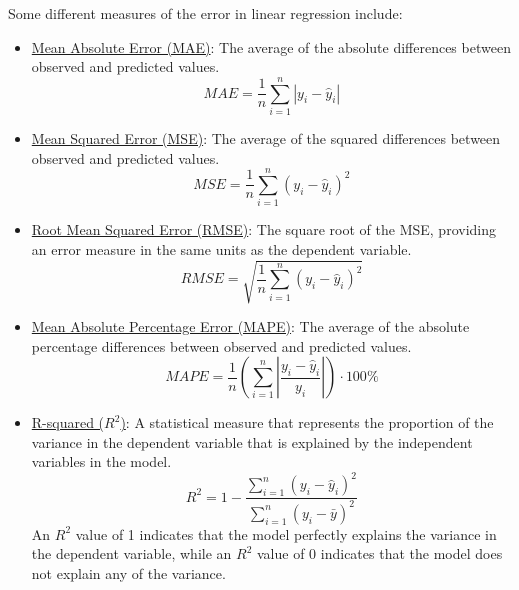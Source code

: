 Some different measures of the error in linear regression include:
\begin{itemize}
    \item \ul{Mean Absolute Error (MAE)}: The average of the absolute differences between observed and predicted values.
    \begin{equation*}
        MAE = \frac{1}{n} \sum_{i=1}^{n} |y_i - \hat{y}_i|
    \end{equation*}
    \item \ul{Mean Squared Error (MSE)}: The average of the squared differences between observed and predicted values.
    \begin{equation*}
        MSE = \frac{1}{n} \sum_{i=1}^{n} (y_i - \hat{y}_i)^2
    \end{equation*}
    \item \ul{Root Mean Squared Error (RMSE)}: The square root of the MSE, providing an error measure in the same units as the dependent variable.
    \begin{equation*}
        RMSE = \sqrt{\frac{1}{n} \sum_{i=1}^{n} (y_i - \hat{y}_i)^2}
    \end{equation*}
    \item \ul{Mean Absolute Percentage Error (MAPE)}: The average of the absolute percentage differences between observed and predicted values.
    \begin{equation*}
        MAPE = \frac{1}{n} \left(\sum_{i=1}^{n} \left| \frac{y_i - \hat{y}_i}{y_i} \right|\right)\cdot 100\%
    \end{equation*}
    \item \ul{R-squared ($R^2$)}: A statistical measure that represents the proportion of the variance in the dependent variable that is explained by the independent variables in the model.
    \begin{equation*}
        R^2 = 1 - \dfrac{\sum\limits_{i=1}^{n} (y_i - \hat{y}_i)^2}{\sum\limits_{i=1}^{n} (y_i - \bar{y})^2}
    \end{equation*}
    An $R^2$ value of 1 indicates that the model perfectly explains the variance in the dependent variable, while an $R^2$ value of 0 indicates that the model does not explain any of the variance.
\end{itemize}


